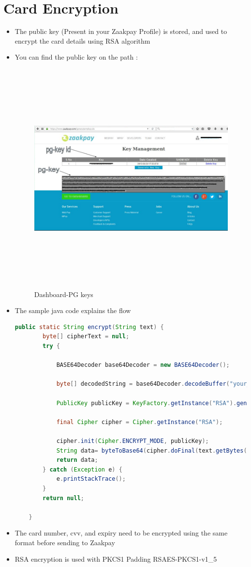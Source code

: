 \documentclass{article}
\begin{document}
\section{Card Encryption}
\begin{itemize}
\item The public key (Present in your Zaakpay Profile) is stored, and used to encrypt the card details using RSA algorithm
\item You can find the public key on the path : 
\begin{figure}[H]
\centering
\caption{Dashboard-PG keys}
\includegraphics[width=1.15\textwidth,height=4.7in]{key.png}
\end{figure}
\newpage
\item The sample java code explains the flow
\begin{lstlisting}[language=java,breaklines=true]
public static String encrypt(String text) {
		byte[] cipherText = null;
		try {

			BASE64Decoder base64Decoder = new BASE64Decoder();

			byte[] decodedString = base64Decoder.decodeBuffer("your_pg_key");

			PublicKey publicKey = KeyFactory.getInstance("RSA").generatePublic(new X509EncodedKeySpec(decodedString));
			
			final Cipher cipher = Cipher.getInstance("RSA");
			
			cipher.init(Cipher.ENCRYPT_MODE, publicKey);
			String data= byteToBase64(cipher.doFinal(text.getBytes("UTF-8")));
			return data;
		} catch (Exception e) {
			e.printStackTrace();
		}
		return null;
		
	}

\end{lstlisting}
\item The card number, cvv, and expiry need to be encrypted using the same format before sending to Zaakpay
\item RSA encryption is used with PKCS1 Padding RSAES-PKCS1-v1\_5
\end{itemize}
\end{document}
